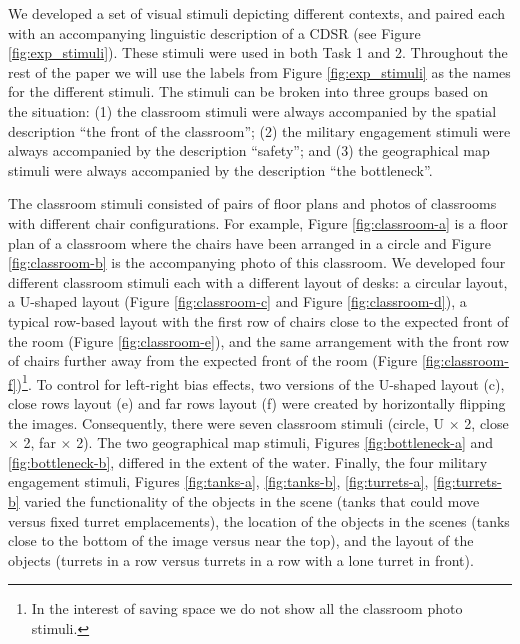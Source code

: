 \documentclass[11pt,letterpaper]{article}
\begin{document}
We developed a set of visual stimuli depicting different contexts, and paired each with an accompanying linguistic description of a CDSR (see Figure \ref{fig:exp_stimuli}). These stimuli were used in both Task 1 and 2. Throughout the rest of the paper we will use the labels from Figure \ref{fig:exp_stimuli} as the names for the different stimuli. The stimuli can be broken into three groups based on the situation: (1) the classroom stimuli were always accompanied by the spatial description ``the front of the classroom''; (2) the military engagement stimuli were always accompanied by the description ``safety''; and (3) the geographical map stimuli were always accompanied by the description ``the bottleneck''.

The classroom stimuli consisted of pairs of floor plans and photos of classrooms with different chair configurations. For example, Figure \ref{fig:classroom-a} is a floor plan of a classroom where the chairs have been arranged in a circle and Figure \ref{fig:classroom-b} is the accompanying photo of this classroom. We developed four different classroom stimuli each with a different layout of desks: a circular layout, a U-shaped layout (Figure \ref{fig:classroom-c} and Figure \ref{fig:classroom-d}), a typical row-based layout with the first row of chairs close to the expected front of the room (Figure \ref{fig:classroom-e}), and the same arrangement with the front row of chairs further away from the expected front of the room (Figure \ref{fig:classroom-f})\footnote{In the interest of saving space we do not show all the classroom photo stimuli.}. To control for left-right bias effects, two versions of the U-shaped layout (c), close rows layout (e) and far rows layout (f) were created by horizontally flipping the images. Consequently, there were seven classroom stimuli (circle, U $\times$ 2, close $\times$ 2, far $\times$ 2).  The two geographical map stimuli, Figures \ref{fig:bottleneck-a} and \ref{fig:bottleneck-b}, differed in the extent of the water.  Finally, the four military engagement stimuli, Figures \ref{fig:tanks-a}, \ref{fig:tanks-b}, \ref{fig:turrets-a}, \ref{fig:turrets-b} varied the functionality of the objects in the scene (tanks that could move versus fixed turret emplacements), the location of the objects in the scenes (tanks close to the bottom of the image versus near the top), and the layout of the objects (turrets in a row versus turrets in a row with a lone turret in front). 
\end{document}
